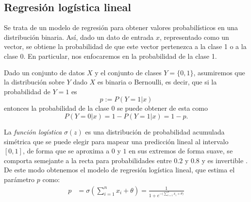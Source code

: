 


\subsection{Regresión logística lineal}

Se trata de un modelo de regresión para obtener valores probabilísticos en una distribución binaria. Así, dado un dato de entrada $x$, representado como un vector, se obtiene la probabilidad de que este vector pertenezca a la clase 1 o a la clase 0. En particular, nos enfocaremos en la probabilidad de la clase 1.

Dado un conjunto de datos $X$ y el conjunto de clases $Y = \{0,1\}$, asumiremos que la distribución sobre $Y$ dado $X$ es binaria o Bernoulli, es decir, que si la probabilidad de $Y=1$ es $$p := P(Y=1|x)$$ entonces la probabilidad de la clase 0 se puede obtener de esta como $$P(Y=0|x) = 1-P(Y=1|x) = 1-p.$$




La \emph{función logística} $\sigma(z)$ es una distribución de probabilidad acumulada simétrica que se puede elegir para mapear una predicción lineal al intervalo $[0,1]$, de forma que se aproxima a $0$ y $1$ en sus extremos de forma suave, se comporta semejante a la recta para probabilidades entre $0.2$ y $0.8$ y es invertible \parencite{Fox2016}.  De este modo obtenemos el modelo de regresión logística lineal, que estima el parámetro $p$ como:
\begin{align*}
 p &= \sigma \left(\sum_{i=1}^n x_i + \theta \right) = \frac{1}{1 + e^{-\big(\sum_{i=1}^n x_i + \theta\big)}}
\end{align*}


